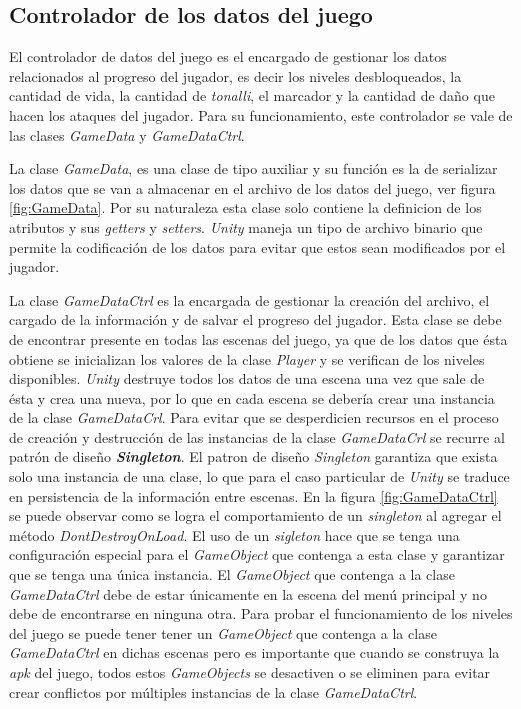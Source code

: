 \subsection{Controlador de los datos del juego}
El controlador de datos del juego es el encargado de gestionar los datos 
relacionados al progreso del jugador, es decir los niveles desbloqueados, la 
cantidad de vida, la cantidad de \textit{tonalli}, el marcador y la cantidad de 
daño que hacen los ataques del jugador. Para su funcionamiento, este controlador 
se vale de las clases \textit{GameData} y \textit{GameDataCtrl}.
\\
\par
La clase \textit{GameData}, es una clase de tipo auxiliar y su función es la de 
serializar los datos que se van a almacenar en el archivo de los datos del 
juego, ver figura \ref{fig:GameData}. Por su naturaleza esta clase solo contiene 
la definicion de los atributos y sus \textit{getters} y \textit{setters}. 
\textit{Unity} maneja un tipo de archivo binario que permite la codificación de 
los datos para evitar que estos sean modificados por el jugador.
\\
\par
La clase \textit{GameDataCtrl} es la encargada de gestionar la creación del 
archivo, el cargado de la información y de salvar el progreso del jugador. Esta 
clase se debe de encontrar presente en todas las escenas del juego, ya que de 
los datos que ésta obtiene se inicializan los valores de la clase 
\textit{Player} y se verifican de los niveles disponibles. \textit{Unity} 
destruye todos los datos de una escena una vez que sale de ésta y crea una 
nueva, por lo que en cada escena se debería crear una instancia de la clase 
\textit{GameDataCrl}. Para evitar que se desperdicien recursos en el proceso de 
creación y destrucción de las instancias de la clase \textit{GameDataCrl} se 
recurre al patrón de diseño\textbf{ \textit{Singleton}}. El patron de diseño 
\textit{Singleton} garantiza que exista solo una instancia de una clase, lo que 
para el caso particular de \textit{Unity} se traduce en persistencia de la 
información entre escenas. En la figura \ref{fig:GameDataCtrl} se puede observar 
como se logra el comportamiento de un \textit{singleton} al agregar el método 
\textit{DontDestroyOnLoad}. El uso de un \textit{sigleton} hace que se tenga una 
configuración especial para el \textit{GameObject} que contenga a esta clase y 
garantizar que se tenga una única instancia. El \textit{GameObject} que contenga 
a la clase \textit{GameDataCtrl} debe de estar únicamente en la escena del menú 
principal y no debe de encontrarse en ninguna otra. Para probar el 
funcionamiento de los niveles del juego se puede tener tener un 
\textit{GameObject} que contenga a la clase \textit{GameDataCtrl} en dichas 
escenas pero es importante que cuando se construya la \textit{apk} del juego, 
todos estos \textit{GameObjects} se desactiven o se eliminen para evitar crear 
conflictos por múltiples instancias de la clase \textit{GameDataCtrl}.  

